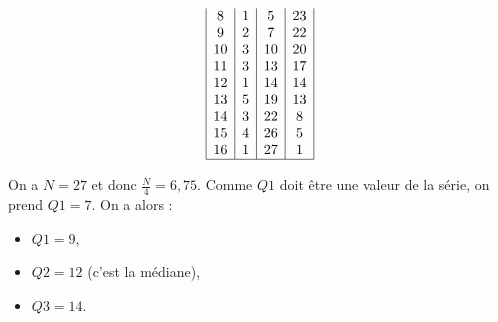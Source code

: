 \begin{defi}
\begin{itemize}
\begin{ex}
\begin{table}[H]
\[\begin{array}{|c|c|c|c|}
                                                      8        & 1        & 5            & 23             \\
                                                      9        & 2        & 7            & 22             \\
                                                      10       & 3        & 10           & 20             \\
                                                      11       & 3        & 13           & 17             \\
                                                      12       & 1        & 14           & 14             \\
                                                      13       & 5        & 19           & 13             \\
                                                      14       & 3        & 22           &  8             \\
                                                      15       & 4        & 26           &  5             \\
                                                      16       & 1        & 27           &  1             \\
                                                      \hline
                                                      \end{array}
                                                \]
                                                \caption{Tableau repr\'esentant des donn\'ees inconnues.}
                                                \label{tab:quartiles}
                                                \end{table}
                                                On a $N = 27$ et donc $\frac{N}{4} = 6,75$.
                                                Comme $Q1$ doit \^etre une valeur de la s\'erie, on prend $Q1 = 7$.
                                                On a alors :
                                                \begin{itemize}
                                                      \item $Q1 = 9$,
                                                      \item $Q2 = 12$ (c'est la m\'ediane),
                                                      \item $Q3 = 14$.
                                                \end{itemize}

\end{ex}
\end{itemize}
\end{defi}
